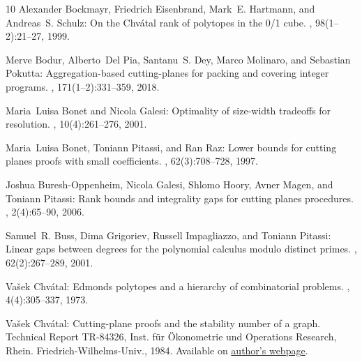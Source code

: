 \documentclass[11pt]{article}
\begin{document}
\begin{thebibliography}{10}
{\sc Alexander Bockmayr, Friedrich Eisenbrand, Mark~E. Hartmann, and Andreas~S.
  Schulz}: On the {C}hv{\'{a}}tal rank of polytopes in the 0/1 cube.
, 98(1--2):21--27, 1999.
\newblock [\epfmtdoi{10.1016/S0166-218X(99)00156-0}]

{\sc Merve Bodur, Alberto~Del Pia, Santanu~S. Dey, Marco Molinaro, and
  Sebastian Pokutta}: Aggregation-based cutting-planes for packing and covering
  integer programs.
, 171(1--2):331--359, 2018.
\newblock [\epfmtdoi{10.1007/s10107-017-1192-x}]

{\sc Maria~Luisa Bonet and Nicola Galesi}: Optimality of size-width tradeoffs
  for resolution.
, 10(4):261--276, 2001.
\newblock [\epfmtdoi{10.1007/s000370100000}]

{\sc Maria~Luisa Bonet, Toniann Pitassi, and Ran Raz}: Lower bounds for cutting
  planes proofs with small coefficients.
, 62(3):708--728, 1997.
\newblock [\epfmtdoi{10.2307/2275569}]

{\sc Joshua Buresh{-}Oppenheim, Nicola Galesi, Shlomo Hoory, Avner Magen, and
  Toniann Pitassi}: Rank bounds and integrality gaps for cutting planes
  procedures.
, 2(4):65--90, 2006.

{\sc Samuel~R. Buss, Dima Grigoriev, Russell Impagliazzo, and Toniann Pitassi}:
  Linear gaps between degrees for the polynomial calculus modulo distinct
  primes.
, 62(2):267--289, 2001.

{\sc Va{\v{s}}ek Chv{\'{a}}tal}: Edmonds polytopes and a hierarchy of
  combinatorial problems.
, 4(4):305--337, 1973.
\newblock [\epfmtdoi{10.1016/0012-365X(73)90167-2}]

{\sc Va{\v{s}}ek Chv{\'a}tal}: Cutting-plane proofs and the stability number of
  a graph.
\newblock Technical Report TR-84326, Inst. f{\"u}r {\"O}konometrie und
  Operations Research, Rhein. Friedrich-Wilhelms-Univ., 1984.
\newblock Available on
  \href{https://users.encs.concordia.ca/~chvatal/Bonn84.pdf}{author's webpage}.


\end{thebibliography}
\end{document}
